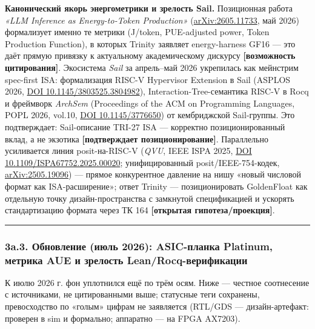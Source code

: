 \documentclass[
  russian,
]{article}
\begin{document}
\textbf{Канонический якорь энергометрики и зрелость Sail.} Позиционная
работа \emph{«LLM Inference as Energy-to-Token Production»}
(\href{https://arxiv.org/abs/2605.11733}{arXiv:2605.11733}, май 2026)
формализует именно те метрики (J/token, PUE-adjusted power, Token
Production Function), в которых Trinity заявляет energy-harness GF16 ---
это даёт прямую привязку к актуальному академическому дискурсу
\textbf{{[}возможность цитирования{]}}. Экосистема \emph{Sail} за
апрель--май 2026 укрепилась как мейнстрим spec-first ISA: формализация
RISC-V Hypervisor Extension в Sail (ASPLOS 2026,
\href{https://doi.org/10.1145/3803525.3804982}{DOI
10.1145/3803525.3804982}), Interaction-Tree-семантика RISC-V в Rocq и
фреймворк \emph{ArchSem} (Proceedings of the ACM on Programming
Languages, POPL 2026, vol.10, \href{https://doi.org/10.1145/3776650}{DOI
10.1145/3776650}) от кембриджской Sail-группы. Это подтверждает:
Sail-описание TRI-27 ISA --- корректно позиционированный вклад, а не
экзотика \textbf{{[}подтверждает позиционирование{]}}. Параллельно
усиливается линия posit-на-RISC-V (\emph{QVU}, IEEE ISPA 2025,
\href{https://doi.org/10.1109/ISPA67752.2025.00020}{DOI
10.1109/ISPA67752.2025.00020}; унифицированный posit/IEEE-754-кодек,
\href{https://arxiv.org/abs/2505.19096}{arXiv:2505.19096}) --- прямое
конкурентное давление на нишу «новый числовой формат как
ISA-расширение»; ответ Trinity --- позиционировать GoldenFloat как
отдельную точку дизайн-пространства с замкнутой спецификацией и ускорять
стандартизацию формата через ТК 164 \textbf{{[}открытая
гипотеза/проекция{]}}.

\begin{center}\rule{0.5\linewidth}{0.5pt}\end{center}

\subsubsection{3a.3. Обновление (июль 2026): ASIC-планка Platinum,
метрика AUE и зрелость
Lean/Rocq-верификации}\label{a.3.-ux43eux431ux43dux43eux432ux43bux435ux43dux438ux435-ux438ux44eux43bux44c-2026-asic-ux43fux43bux430ux43dux43aux430-platinum-ux43cux435ux442ux440ux438ux43aux430-aue-ux438-ux437ux440ux435ux43bux43eux441ux442ux44c-leanrocq-ux432ux435ux440ux438ux444ux438ux43aux430ux446ux438ux438}

К июлю 2026 г. фон уплотнился ещё по трём осям. Ниже --- честное
соотнесение с источниками, не цитированными выше; статусные теги
сохранены, превосходство по «голым» цифрам не заявляется (RTL/GDS
— дизайн-артефакт: проверен в sim и формально; аппаратно — на FPGA AX7203).
\end{document}

